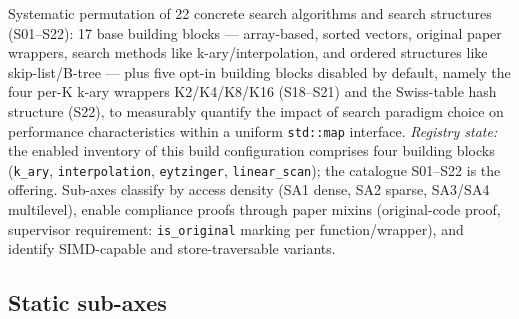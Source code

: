 Systematic permutation of 22 concrete search algorithms and search structures (S01--S22): 17 base building blocks --- array-based, sorted vectors, original paper wrappers, search methods like k-ary/\allowbreak{}interpolation, and ordered structures like skip-list/\allowbreak{}B-tree --- plus five opt-in building blocks disabled by default, namely the four per-K k-ary wrappers K2/\allowbreak{}K4/\allowbreak{}K8/\allowbreak{}K16 (S18--S21) and the Swiss-table hash structure (S22), to measurably quantify the impact of search paradigm choice on performance characteristics within a uniform \texttt{std::map} interface\@. \emph{Registry state:} the enabled inventory of this build configuration comprises four building blocks (\texttt{k\_\allowbreak{}ary}, \texttt{interpolation}, \texttt{eytzinger}, \texttt{linear\_\allowbreak{}scan}); the catalogue S01--S22 is the offering. Sub-axes classify by access density (SA1 dense, SA2 sparse, SA3/\allowbreak{}SA4 multilevel), enable compliance proofs through paper mixins (original-code proof, supervisor requirement: \texttt{is\_\allowbreak{}original} marking per function/\allowbreak{}wrapper), and identify SIMD-capable and store-traversable variants.

\subsection*{Static sub-axes}

